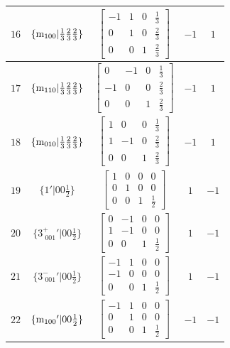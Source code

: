 \documentclass[fleqn,8pt]{jsarticle}
\begin{document}
\begin{longtable}{ccccc}
$ 16 $ & $ \{{\rm m}_{100}|\frac{1}{3} \frac{2}{3} \frac{2}{3}\} $ & $ \begin{bmatrix} -1 & 1 & 0 & \frac{1}{3} \\ 0 & 1 & 0 & \frac{2}{3} \\ 0 & 0 & 1 & \frac{2}{3} \end{bmatrix} $ & $ -1 $ & $ 1 $ \\ \hline
$ 17 $ & $ \{{\rm m}_{110}|\frac{1}{3} \frac{2}{3} \frac{2}{3}\} $ & $ \begin{bmatrix} 0 & -1 & 0 & \frac{1}{3} \\ -1 & 0 & 0 & \frac{2}{3} \\ 0 & 0 & 1 & \frac{2}{3} \end{bmatrix} $ & $ -1 $ & $ 1 $ \\ \hline
$ 18 $ & $ \{{\rm m}_{010}|\frac{1}{3} \frac{2}{3} \frac{2}{3}\} $ & $ \begin{bmatrix} 1 & 0 & 0 & \frac{1}{3} \\ 1 & -1 & 0 & \frac{2}{3} \\ 0 & 0 & 1 & \frac{2}{3} \end{bmatrix} $ & $ -1 $ & $ 1 $ \\ \hline
$ 19 $ & $ \{1{}'|0 0 \frac{1}{2}\} $ & $ \begin{bmatrix} 1 & 0 & 0 & 0 \\ 0 & 1 & 0 & 0 \\ 0 & 0 & 1 & \frac{1}{2} \end{bmatrix} $ & $ 1 $ & $ -1 $ \\ \hline
$ 20 $ & $ \{3^{+}_{\,\,001}{}'|0 0 \frac{1}{2}\} $ & $ \begin{bmatrix} 0 & -1 & 0 & 0 \\ 1 & -1 & 0 & 0 \\ 0 & 0 & 1 & \frac{1}{2} \end{bmatrix} $ & $ 1 $ & $ -1 $ \\ \hline
$ 21 $ & $ \{3^{-}_{\,\,001}{}'|0 0 \frac{1}{2}\} $ & $ \begin{bmatrix} -1 & 1 & 0 & 0 \\ -1 & 0 & 0 & 0 \\ 0 & 0 & 1 & \frac{1}{2} \end{bmatrix} $ & $ 1 $ & $ -1 $ \\ \hline
$ 22 $ & $ \{{\rm m}_{100}{}'|0 0 \frac{1}{2}\} $ & $ \begin{bmatrix} -1 & 1 & 0 & 0 \\ 0 & 1 & 0 & 0 \\ 0 & 0 & 1 & \frac{1}{2} \end{bmatrix} $ & $ -1 $ & $ -1 $ \\ \hline

\end{longtable}
\end{document}
